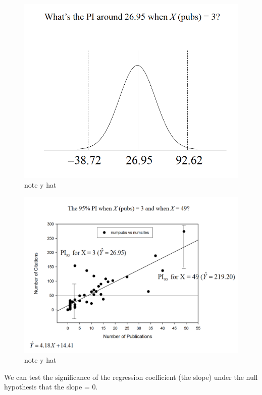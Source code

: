 \documentclass[]{book}
\theoremstyle{definition}
\theoremstyle{definition}
\theoremstyle{definition}
\theoremstyle{remark}
\begin{document}
{\begin{figure}
\centering
\includegraphics{img/hicksreg19.png}
\caption{note y hat}
\end{figure}

\begin{figure}
\centering
\includegraphics{img/hicksreg20.png}
\caption{note y hat}
\end{figure}

We can test the significance of the regression coefficient (the slope)
under the null hypothesis that the slope = 0.

}
\end{document}
